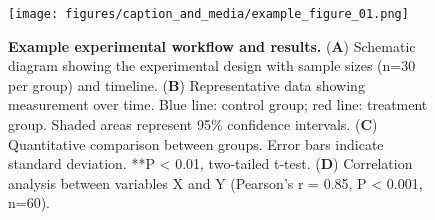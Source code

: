 

\begin{figure}[htbp]
\centering
\texttt{[image: figures/caption\_and\_media/example\_figure\_01.png]}
\caption{\textbf{Example experimental workflow and results.}
(\textbf{A}) Schematic diagram showing the experimental design with sample sizes
(n=30 per group) and timeline.
(\textbf{B}) Representative data showing measurement over time. Blue line: control
group; red line: treatment group. Shaded areas represent 95\% confidence intervals.
(\textbf{C}) Quantitative comparison between groups. Error bars indicate standard
deviation. **P < 0.01, two-tailed t-test.
(\textbf{D}) Correlation analysis between variables X and Y (Pearson's r = 0.85,
P < 0.001, n=60).}
\label{fig:example01}
\end{figure}


